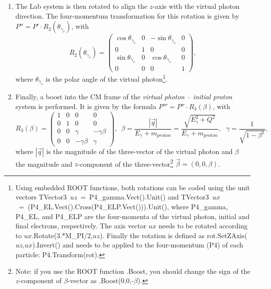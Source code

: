 \begin{enumerate}
\item The Lab system is then rotated to align the $z$-axis with the virtual photon direction. The four-momentum transformation for this rotation is given by $P'' = P' \cdot R_2 (\theta_{\gamma_{v}})$, with 
\begin{equation}
R_{2}(\theta_{\gamma_{v}})=\begin{pmatrix}
\cos\theta_{\gamma_{v}} &0  &-\sin\theta_{\gamma_{v}}  &0 \\ 
 0& 1 & 0 &0 \\ 
 \sin\theta_{\gamma_{v}} &0  &\cos\theta_{\gamma_{v}}  & 0\\ 
0 &0  & 0 &1 
\end{pmatrix},
\end{equation}
where $\theta_{\gamma_v}$ is the polar angle of the virtual photon\footnote[2]{Using embedded ROOT functions, both rotations can be coded using the unit vectors TVector3~$uz$~=~P4\_gamma.Vect().Unit() and 
 TVector3~$ux$~=~(P4\_EL.Vect().Cross(P4\_ELP.Vect())).Unit(), where P4\_gamma, P4\_EL, and P4\_ELP are the four-momenta of the virtual photon, initial and final electrons, respectively. 
 The axis vector $ux$ needs to be rotated according to $ux$.Rotate(3.*M\_PI/2,$uz$).
Finally the rotation is defined as rot.SetZAxis($uz$,$ux$).Invert() and needs to be applied to the four-momentum (P4) of each particle:
 P4.Transform(rot).}.

\item Finally, a boost into the CM frame of the {\em virtual photon -- initial proton} system is performed. It is given by the formula $P''' = P'' \cdot R_3(\beta)$, with 
\begin{equation}
R_{3}(\beta) = \begin{pmatrix}
1 &0  &0  &0 \\ 
0 &1  &0  &0 \\ 
 0&  0& \gamma  &-\gamma \beta  \\ 
 0&  0& -\gamma \beta  & \gamma 
\end{pmatrix}, \, \, \, \beta =\frac{|\overrightarrow{q}|}{E_{\gamma }+m_{proton}}=\frac{\sqrt{E^{2}_{\gamma }+Q^{2}}}{E_{\gamma }+m_{proton}}, \, \, \,\,  \gamma =\frac{1}{\sqrt{1-\beta ^{2}}},
\end{equation}
where $|\overrightarrow{q}|$ is the magnitude of the three-vector of the virtual photon and $\beta$ the magnitude and $z$-component of the three-vector\footnote[3]{
Note: if you use the ROOT function .Boost, you should change the sign of the $z$-component of $\beta$-vector as .Boost(0,0,-$\beta$).} $\overrightarrow{\beta}=(0,0,\beta)$.
\end{enumerate}


